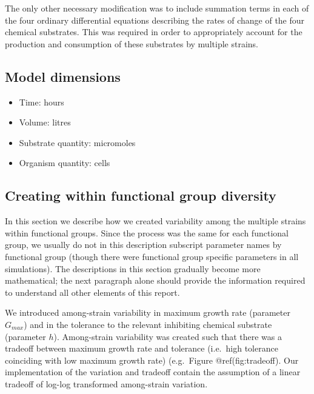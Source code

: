 \documentclass{article}
\begin{document}
The only other necessary modification was to include summation terms in
each of the four ordinary differential equations describing the rates of
change of the four chemical substrates. This was required in order to
appropriately account for the production and consumption of these
substrates by multiple strains.

\hypertarget{model-dimensions}{%
\subsection{Model dimensions}\label{model-dimensions}}

\begin{itemize}
\tightlist
\item
  Time: hours
\item
  Volume: litres
\item
  Substrate quantity: micromoles
\item
  Organism quantity: cells
\end{itemize}

\hypertarget{creating-within-functional-group-diversity}{%
\subsection{Creating within functional group
diversity}\label{creating-within-functional-group-diversity}}

In this section we describe how we created variability among the
multiple strains within functional groups. Since the process was the
same for each functional group, we usually do not in this description
subscript parameter names by functional group (though there were
functional group specific parameters in all simulations). The
descriptions in this section gradually become more mathematical; the
next paragraph alone should provide the information required to
understand all other elements of this report.

We introduced among-strain variability in maximum growth rate (parameter
\(G_{max}\)) and in the tolerance to the relevant inhibiting chemical
substrate (parameter \(h\)). Among-strain variability was created such
that there was a tradeoff between maximum growth rate and tolerance
(i.e.~high tolerance coinciding with low maximum growth rate)
(e.g.~Figure @ref(fig:tradeoff). Our implementation of the variation and
tradeoff contain the assumption of a linear tradeoff of log-log
transformed among-strain variation.
\end{document}
